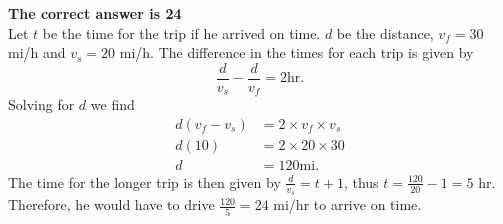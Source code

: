 \documentclass{article}
\begin{document}
\textbf{The correct answer is 24}\\[1 ex]
Let $t$ be the time for the trip if he arrived on time. $d$ be the distance, $v_f=30$ mi/h and $v_s=20$ mi/h. The difference in the times for each trip is given by
\begin{equation*}
\frac{d}{v_s}-\frac{d}{v_f}=2\textrm{hr}.
\end{equation*}
Solving for $d$ we find
\begin{align*}
d(v_f-v_s)&=2\times v_f \times v_s\\
d(10)&=2\times20\times30\\
d&=120\textrm{mi}.
\end{align*}
The time for the longer trip is then given by $\frac{d}{v_s}=t+1$, thus $t=\frac{120}{20}-1=5$ hr. Therefore, he would have to drive $\frac{120}{5}=24$ mi/hr to arrive on time.
\end{document}
